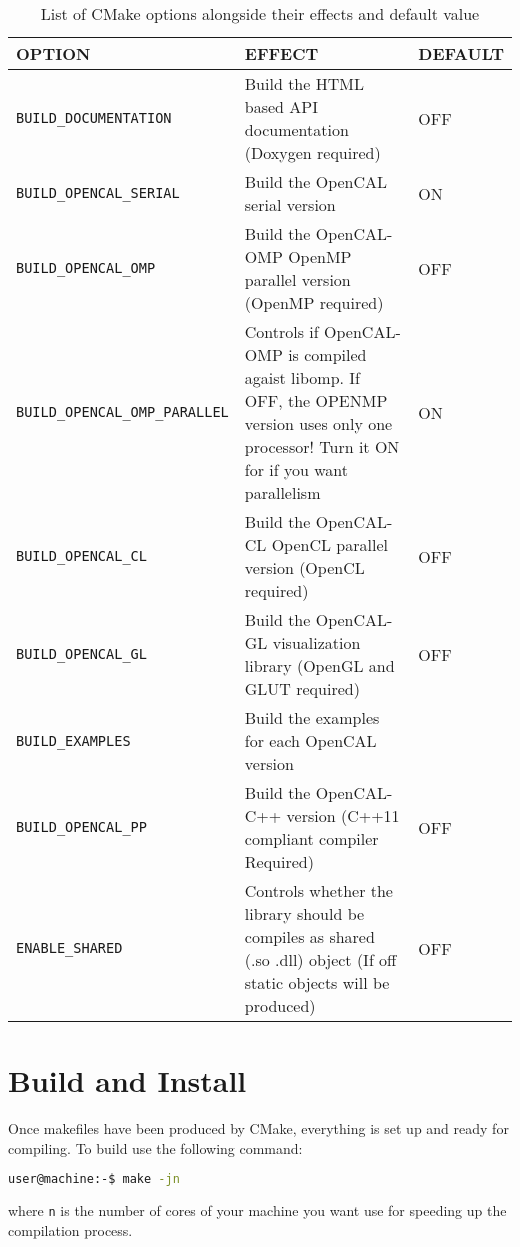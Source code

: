 \begin{table}[]
  \centering
  \caption{List of CMake options alongside their effects and default
    value}
  \label{ch:installation:cmakeoptions}
  \begin{tabularx}{\textwidth}{lXl}
    \hline
    \textbf{OPTION} & \textbf{EFFECT} & \textbf{DEFAULT}\\
    \hline\hline
    \texttt{BUILD\_DOCUMENTATION}  &  Build the HTML based API documentation (Doxygen required)  & OFF   \\ \hline
    \texttt{BUILD\_OPENCAL\_SERIAL} & Build the OpenCAL serial version  & ON   \\ \hline
    \texttt{BUILD\_OPENCAL\_OMP} &  Build the OpenCAL-OMP OpenMP parallel version (OpenMP required)    & OFF \\ \hline
    \texttt{BUILD\_OPENCAL\_OMP\_PARALLEL} &  Controls if OpenCAL-OMP is compiled agaist libomp. If OFF, the OPENMP version uses only one processor! Turn it ON for if you want parallelism  &  ON  \\ \hline
    \texttt{BUILD\_OPENCAL\_CL} &  Build the OpenCAL-CL OpenCL parallel version (OpenCL required)     &OFF\\ \hline
    \texttt{BUILD\_OPENCAL\_GL} & Build the OpenCAL-GL visualization library (OpenGL and GLUT required)      &OFF \\ \hline                          
    \texttt{BUILD\_EXAMPLES} & Build the examples for each OpenCAL version      &\\ \hline
    \texttt{BUILD\_OPENCAL\_PP} &  Build the OpenCAL-C++ version (C++11 compliant compiler Required)    &  OFF\\ \hline
    \texttt{ENABLE\_SHARED} &  Controls whether the library should be compiles as shared  (.so .dll) object (If off static objects will be produced) & OFF\\ \hline                        
  \end{tabularx}
\end{table}


\section{Build and Install}
Once makefiles have been produced by CMake, everything is set up and
ready for compiling. To build use the following command:

\begin{lstlisting}[numbers=none,language=bash,label={ch:quickstart:ebuild}]
  user@machine:-$ make -jn
\end{lstlisting}
where \verb'n' is the number of cores of your machine you want use for
speeding up the compilation process.

